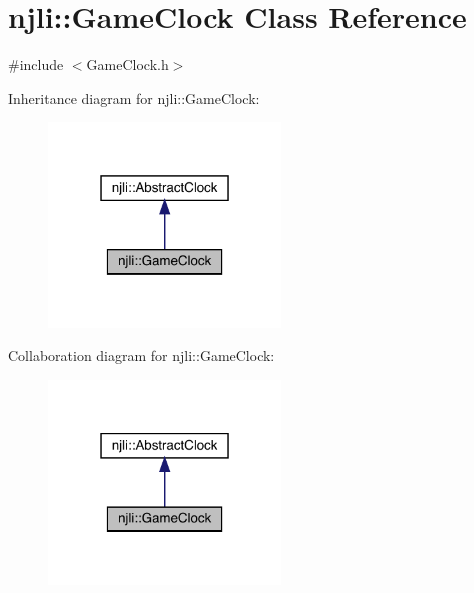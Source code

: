 \hypertarget{classnjli_1_1_game_clock}{}\section{njli\+:\+:Game\+Clock Class Reference}
\label{classnjli_1_1_game_clock}


{\ttfamily \#include $<$Game\+Clock.\+h$>$}



Inheritance diagram for njli\+:\+:Game\+Clock\+:\nopagebreak
\begin{figure}[H]
\begin{center}
\leavevmode
\includegraphics[width=175pt]{classnjli_1_1_game_clock__inherit__graph}
\end{center}
\end{figure}


Collaboration diagram for njli\+:\+:Game\+Clock\+:\nopagebreak
\begin{figure}[H]
\begin{center}
\leavevmode
\includegraphics[width=175pt]{classnjli_1_1_game_clock__coll__graph}
\end{center}
\end{figure}
